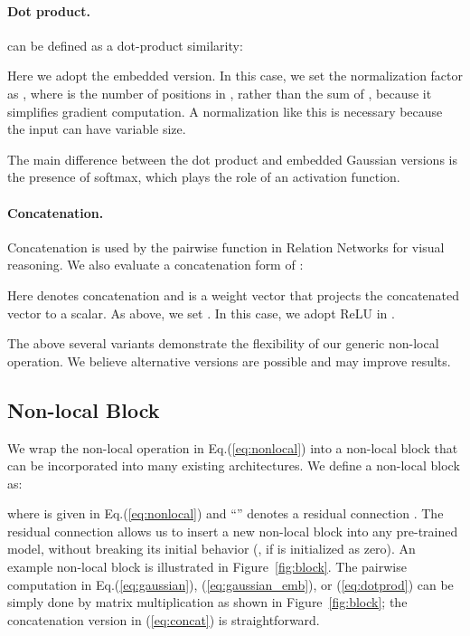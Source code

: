 \documentclass[10pt,twocolumn,letterpaper]{article}
\begin{document}
\paragraph{Dot product.}  can be defined as a dot-product similarity:

Here we adopt the embedded version. In this case, we set the normalization factor as , where  is the number of positions in , rather than the sum of , because it simplifies gradient computation. A normalization like this is necessary because the input can have variable size.

The main difference between the dot product and embedded Gaussian versions is the presence of softmax, which plays the role of an activation function.

\paragraph{Concatenation.} Concatenation is used by the pairwise function in Relation Networks \cite{Santoro2017} for visual reasoning. We also evaluate a concatenation form of :

Here  denotes concatenation and  is a weight vector that projects the concatenated vector to a scalar. As above, we set . In this case, we adopt ReLU \cite{Nair2010} in .

\vspace{1em} The above several variants demonstrate the flexibility of our generic non-local operation. We believe alternative versions are possible and may improve results.

\subsection{Non-local Block}

We wrap the non-local operation in Eq.(\ref{eq:nonlocal}) into a non-local block that can be incorporated into many existing architectures. We define a non-local block as:

where  is given in Eq.(\ref{eq:nonlocal}) and ``'' denotes a residual connection \cite{He2016}. The residual connection allows us to insert a new non-local block into any pre-trained model, without breaking its initial behavior (\eg, if  is initialized as zero).
An example non-local block is illustrated in Figure~\ref{fig:block}. The pairwise computation in Eq.(\ref{eq:gaussian}), (\ref{eq:gaussian_emb}), or (\ref{eq:dotprod}) can be simply done by matrix multiplication as shown in Figure~\ref{fig:block}; the concatenation version in (\ref{eq:concat}) is straightforward.
\end{document}
